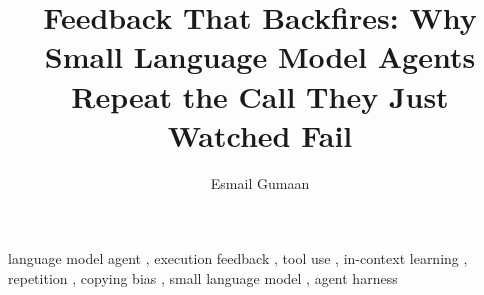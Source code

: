 \documentclass[preprint,11pt]{elsarticle}
\begin{document}
\begin{frontmatter}

\title{Feedback That Backfires: Why Small Language Model Agents Repeat
the Call They Just Watched Fail}

\author{Esmail Gumaan}
\address{Faculty of Computer Science and Mathematics, University of Passau,
Passau, Germany}

\begin{abstract}

\end{abstract}

\begin{keyword}
language model agent \sep
execution feedback \sep
tool use \sep
in-context learning \sep
repetition \sep
copying bias \sep
small language model \sep
agent harness
\end{keyword}

\end{frontmatter}

\enlargethispage{-4\baselineskip}



















\appendix

\end{document}

